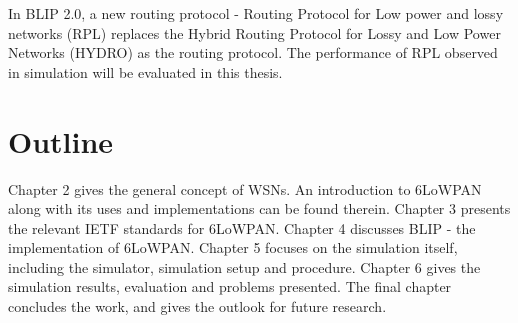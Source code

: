 In BLIP 2.0, a new routing protocol - Routing Protocol for Low power and lossy networks (RPL) replaces the Hybrid Routing Protocol for Lossy and Low Power Networks (HYDRO) as the routing protocol. The performance of RPL observed in simulation will be evaluated in this thesis.
\section{Outline}
\label{Intr:Outline}

Chapter 2 gives the general concept of WSNs. An introduction to 6LoWPAN along with its uses and implementations can be found therein. Chapter 3 presents the relevant IETF standards for 6LoWPAN. Chapter 4 discusses BLIP - the implementation of 6LoWPAN. Chapter 5 focuses on the simulation itself,  including the simulator, simulation setup and procedure. Chapter 6 gives the simulation results, evaluation and problems presented. The final chapter concludes the work, and gives the outlook for future research.
